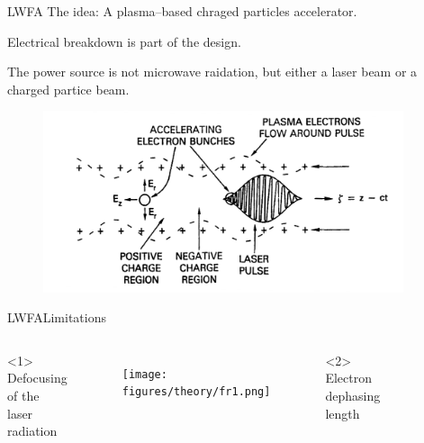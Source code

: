 \documentclass[]{beamer}
\begin{document}
  \begin{frame}{LWFA}
  The idea: A plasma--based chraged particles accelerator.

  Electrical breakdown is part of the design.

  The power source is not microwave raidation, but either a laser beam or a charged partice beam.
  \begin{figure}
    \includegraphics[width=300pt]{figures/lwfa-schematic.PNG}
  \end{figure}
  \end{frame}
  \begin{frame}{LWFA}{Limitations}
    \begin{columns}  
        <1>
    Defocusing of the laser radiation
      \begin{figure}
          \texttt{[image: figures/theory/fr1.png]}
      \end{figure}
        <2>
      Electron dephasing length
      \begin{figure}
          \includegraphics[width=0.3\textwidth]{figures/ablated.png}
      \end{figure}
    \end{columns}
  \end{frame}
\end{document}
